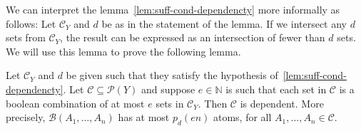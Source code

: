 \noindent
We can interpret the lemma~\ref{lem:suff-cond-dependencty} more informally as follows: Let $\mathcal{C}_Y$ and $d$ be as in the statement of the lemma. If we intersect any $d$ sets from $\mathcal{C}_Y$, the result can be expressed as an intersection of fewer than $d$ sets. We will use this lemma to prove the following lemma.

\begin{lemma}
    \label{lem:dependent-boolean-comb}
    Let $\mathcal{C}_Y$ and $d$ be given such that they satisfy the hypothesis of~\ref{lem:suff-cond-dependencty}. Let $\mathcal{C} \subseteq \mathcal{P}(Y)$ and suppose $e \in \mathbb{N}$ is such that each set in $\mathcal{C}$ is a boolean combination of at most $e$ sets in $\mathcal{C}_Y$. Then $\mathcal{C}$ is dependent. More precisely, $\mathcal{B}(A_1, \dots, A_n)$ has at most $p_d(en)$ atoms, for all $A_1, \dots, A_n \in \mathcal{C}$.
\end{lemma}

